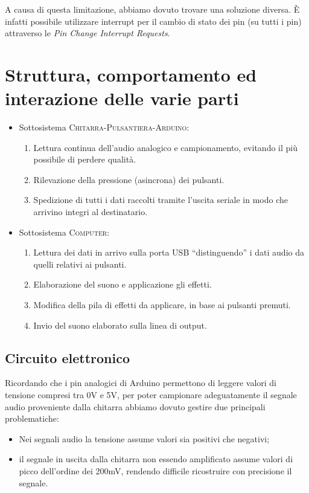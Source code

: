 \documentclass[a4paper,11pt]{article}
\begin{document}
A causa di questa limitazione, abbiamo dovuto trovare una soluzione diversa. È infatti possibile utilizzare interrupt per il cambio di stato dei pin (su tutti i pin) attraverso le \emph{Pin Change Interrupt Requests}\cite{allinterrupts}.

\section{Struttura, comportamento ed interazione delle varie parti}

\begin{itemize}
    \item Sottosistema \textsc{Chitarra-Pulsantiera-Arduino}:
    \begin{enumerate}
        \item Lettura continua dell'audio analogico e campionamento, evitando il più possibile di perdere qualità.
        \item Rilevazione della pressione (asincrona) dei pulsanti.
        \item Spedizione di tutti i dati raccolti tramite l'uscita seriale in modo che arrivino integri al destinatario.
    \end{enumerate}
    \item Sottosistema \textsc{Computer}:
    \begin{enumerate}
        \item Lettura dei dati in arrivo sulla porta USB ``distinguendo'' i dati audio da quelli relativi ai pulsanti.
        \item Elaborazione del suono e applicazione gli effetti.
        \item Modifica della pila di effetti da applicare, in base ai pulsanti premuti.
        \item Invio del suono elaborato sulla linea di output.
    \end{enumerate}
\end{itemize}

\subsection{Circuito elettronico}
Ricordando che i pin analogici di Arduino permettono di leggere valori di tensione compresi tra 0V e 5V, per poter campionare adeguatamente il segnale audio proveniente dalla chitarra abbiamo dovuto gestire due principali problematiche:
\begin{itemize}
    \item Nei segnali audio la tensione assume valori sia positivi che negativi;
    \item il segnale in uscita dalla chitarra non essendo amplificato assume valori di picco dell'ordine dei 200mV, rendendo difficile ricostruire con precisione il segnale.
\end{itemize}
\end{document}
